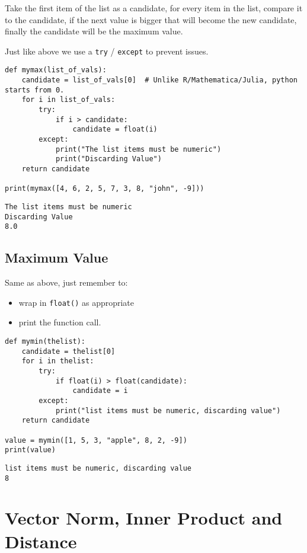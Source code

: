 \documentclass[11pt]{article}
\begin{document}
Take the first item of the list as a candidate, for every item in the list, compare it to the candidate, if the next value is bigger that will become the new candidate, finally the candidate will be the maximum value.

Just like above we use a \texttt{try} / \texttt{except} to prevent issues.

\begin{verbatim}
def mymax(list_of_vals):
    candidate = list_of_vals[0]  # Unlike R/Mathematica/Julia, python starts from 0.
    for i in list_of_vals:
        try:
            if i > candidate:
                candidate = float(i)
        except:
            print("The list items must be numeric")
            print("Discarding Value")
    return candidate

print(mymax([4, 6, 2, 5, 7, 3, 8, "john", -9]))
\end{verbatim}

\begin{verbatim}
The list items must be numeric
Discarding Value
8.0
\end{verbatim}

\subsection{Maximum Value}
\label{sec:orgf345f2e}

Same as above, just remember to:

\begin{itemize}
\item wrap in \texttt{float()} as appropriate
\item print the function call.
\end{itemize}


\begin{verbatim}
def mymin(thelist):
    candidate = thelist[0]
    for i in thelist:
        try:
            if float(i) > float(candidate):
                candidate = i
        except:
            print("list items must be numeric, discarding value")
    return candidate

value = mymin([1, 5, 3, "apple", 8, 2, -9])
print(value)
\end{verbatim}

\begin{verbatim}
list items must be numeric, discarding value
8
\end{verbatim}

\section{Vector Norm, Inner Product and Distance}
\label{sec:org17d144e}
\end{document}
